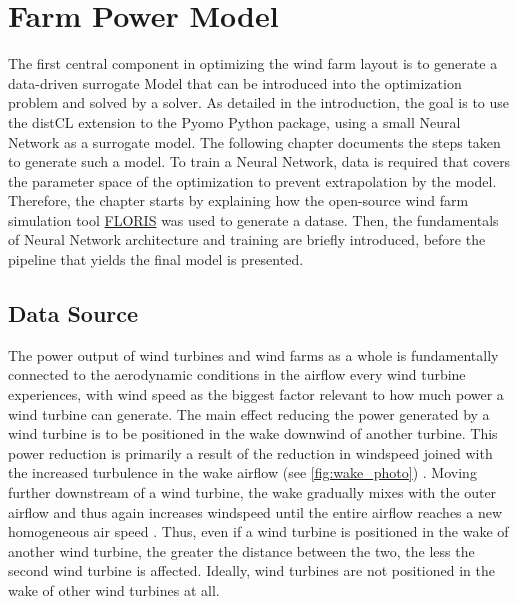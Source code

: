 \chapter{Farm Power Model}\label{chapter:power_model}

The first central component in optimizing the wind farm layout is to generate a data-driven surrogate Model that can be introduced into the optimization problem and solved by a solver. As detailed in the introduction, the goal is to use the distCL extension \cite{alcantara_ruiz_distcl_2022_git} to the Pyomo Python package, using a small Neural Network as a surrogate model. The following chapter documents the steps taken to generate such a model. 
To train a Neural Network, data is required that covers the parameter space of the optimization to prevent extrapolation by the model. Therefore, the chapter starts by explaining how the open-source wind farm simulation tool \href{https://www.nrel.gov/wind/floris.html}{FLORIS} \cite{nrel_floris} was used to generate a datase. Then, the fundamentals of Neural Network architecture and training are briefly introduced, before the pipeline that yields the final model is presented.

\section{Data Source}

The power output of wind turbines and wind farms as a whole is fundamentally connected to the aerodynamic conditions in the airflow every wind turbine experiences, with wind speed as the biggest factor relevant to how much power a wind turbine can generate. The main effect reducing the power generated by a wind turbine is to be positioned in the wake downwind of another turbine. This power reduction is primarily a result of the reduction in windspeed joined with the increased turbulence in the wake airflow (see \ref{fig:wake_photo})  \cite{KIRANOUDIS1997439}. Moving further downstream of a wind turbine, the wake gradually mixes with the outer airflow and thus again increases windspeed until the entire airflow reaches a new homogeneous air speed \cite{MAGNUSSON1999169}. Thus, even if a wind turbine is positioned in the wake of another wind turbine, the greater the distance between the two, the less the second wind turbine is affected. Ideally, wind turbines are not positioned in the wake of other wind turbines at all. 

